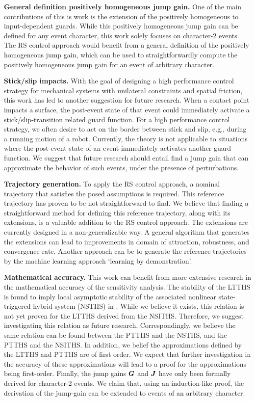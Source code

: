 \documentclass[../DC2017114Bouma.tex]{subfiles}
\begin{document}
\textbf{General definition positively homogeneous jump gain.} One of the main contributions of this is work is the extension of the positively homogeneous to input-dependent guards. While this positively homogeneous jump gain can be defined for any event character, this work solely focuses on character-2 events. The RS control approach would benefit from a general definition of the positively homogeneous jump gain, which can be used to straightforwardly compute the positively homogeneous jump gain for an event of arbitrary character.

\textbf{Stick/slip impacts.} With the goal of designing a high performance control strategy for mechanical systems with unilateral constraints and spatial friction, this work has led to another suggestion for future research. When a contact point impacts a surface, the post-event state of that event could immediately activate a stick/slip-transition related guard function. For a high performance control strategy, we often desire to act on the border between stick and slip, e.g., during a running motion of a robot. Currently, the theory is not applicable to situations where the post-event state of an event immediately activates another guard function. We suggest that future research should entail find a jump gain that can approximate the behavior of such events, under the presence of perturbations.

\textbf{Trajectory generation.} To apply the RS control approach, a nominal trajectory that satisfies the posed assumptions is required. This reference trajectory has proven to be not straightforward to find. We believe that finding a straightforward method for defining this reference trajectory, along with its extensions, is a valuable addition to the RS control approach. The extensions are currently designed in a non-generalizable way. A general algorithm that generates the extensions can lead to improvements in domain of attraction, robustness, and convergence rate. Another approach can be to generate the reference trajectories by the machine learning approach `learning by demonstration'.

\textbf{Mathematical accuracy.} This work can benefit from more extensive research in the mathematical accuracy of the sensitivity analysis. The stability of the LTTHS is found to imply local asymptotic stability of the associated nonlinear state-triggered hybrid system (NSTHS) in \cite{Rijnen2017}. While we believe it exists, this relation is not yet proven for the LTTHS derived from the NSITHS. Therefore, we suggest investigating this relation as future research. Correspondingly, we believe the same relation can be found between the PTTHS and the NSTHS, and the PTTHS and the NSITHS. In addition, we belief the approximations defined by the LTTHS and PTTHS are of first order. We expect that further investigation in the accuracy of these approximations will lead to a proof for the approximations being first-order. Finally, the jump gains ${\boldsymbol{G}}$ and ${\boldsymbol{J}}$ have only been formally derived for character-2 events. We claim that, using an induction-like proof, the derivation of the jump-gain can be extended to events of an arbitrary character.
\end{document}
